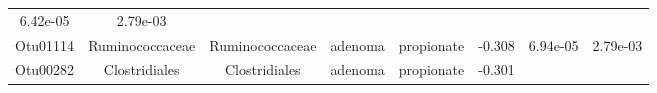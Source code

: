 \documentclass[11pt,]{article}
\begin{document}
\begin{longtable}[]{@{}cccccccc@{}}
\begin{minipage}[t]{0.08\columnwidth}
6.42e-05\strut
\end{minipage} & \begin{minipage}[t]{0.08\columnwidth}\centering\strut
2.79e-03\strut
\end{minipage}\tabularnewline
\begin{minipage}[t]{0.08\columnwidth}\centering\strut
Otu01114\strut
\end{minipage} & \begin{minipage}[t]{0.15\columnwidth}\centering\strut
Ruminococcaceae\strut
\end{minipage} & \begin{minipage}[t]{0.15\columnwidth}\centering\strut
Ruminococcaceae\strut
\end{minipage} & \begin{minipage}[t]{0.08\columnwidth}\centering\strut
adenoma\strut
\end{minipage} & \begin{minipage}[t]{0.09\columnwidth}\centering\strut
propionate\strut
\end{minipage} & \begin{minipage}[t]{0.07\columnwidth}\centering\strut
-0.308\strut
\end{minipage} & \begin{minipage}[t]{0.08\columnwidth}\centering\strut
6.94e-05\strut
\end{minipage} & \begin{minipage}[t]{0.08\columnwidth}\centering\strut
2.79e-03\strut
\end{minipage}\tabularnewline
\begin{minipage}[t]{0.08\columnwidth}\centering\strut
Otu00282\strut
\end{minipage} & \begin{minipage}[t]{0.15\columnwidth}\centering\strut
Clostridiales\strut
\end{minipage} & \begin{minipage}[t]{0.15\columnwidth}\centering\strut
Clostridiales\strut
\end{minipage} & \begin{minipage}[t]{0.08\columnwidth}\centering\strut
adenoma\strut
\end{minipage} & \begin{minipage}[t]{0.09\columnwidth}\centering\strut
propionate\strut
\end{minipage} & \begin{minipage}[t]{0.07\columnwidth}\centering\strut
-0.301\strut
\end{minipage} & \begin{minipage}[t]{0.08\columnwidth}\centering\strut

\end{minipage}
\end{longtable}
\end{document}
